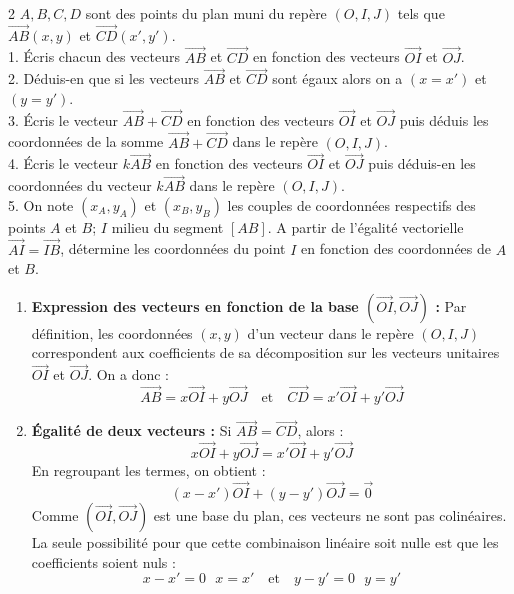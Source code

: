 \begin{multicols*}{2}
  	$A, B, C, D$ sont des points du plan muni du repère $(O, I, J)$ tels que $\overrightarrow{AB}(x, y)$ et $\overrightarrow{CD}(x', y')$. \\
  	1. Écris chacun des vecteurs $\overrightarrow{AB}$ et $\overrightarrow{CD}$ en fonction des vecteurs $\overrightarrow{OI}$ et $\overrightarrow{OJ}$. \\
  	2. Déduis-en que si les vecteurs $\overrightarrow{AB}$ et $\overrightarrow{CD}$ sont égaux alors on a $(x = x')$ et $(y = y')$. \\
  	3. Écris le vecteur $\overrightarrow{AB} + \overrightarrow{CD}$ en fonction des vecteurs $\overrightarrow{OI}$ et $\overrightarrow{OJ}$ puis déduis les coordonnées de la somme $\overrightarrow{AB} + \overrightarrow{CD}$ dans le repère $(O, I, J)$. \\
  	4. Écris le vecteur $k\overrightarrow{AB}$ en fonction des vecteurs $\overrightarrow{OI}$ et $\overrightarrow{OJ}$ puis déduis-en les coordonnées du vecteur $k\overrightarrow{AB}$ dans le repère $(O, I, J)$. \\
  	5. On note $(x_A, y_A)$ et $(x_B, y_B)$ les couples de coordonnées respectifs des points $A$ et $B$; $I$ milieu du segment $[AB]$. A partir de l'égalité vectorielle $\overrightarrow{AI} = \overrightarrow{IB}$, détermine les coordonnées du point $I$ en fonction des coordonnées de $A$ et $B$.\\
  	\dure 
  	\resul 
  	\begin{enumerate}
  		\item \textbf{Expression des vecteurs en fonction de la base $(\overrightarrow{OI}, \overrightarrow{OJ})$ :}
  		Par définition, les coordonnées $(x, y)$ d'un vecteur dans le repère $(O, I, J)$ correspondent aux coefficients de sa décomposition sur les vecteurs unitaires $\overrightarrow{OI}$ et $\overrightarrow{OJ}$. On a donc :
  		\[ \overrightarrow{AB} = x\overrightarrow{OI} + y\overrightarrow{OJ} \quad \text{et} \quad \overrightarrow{CD} = x'\overrightarrow{OI} + y'\overrightarrow{OJ} \]
  		
  		\item \textbf{Égalité de deux vecteurs :}
  		Si $\overrightarrow{AB} = \overrightarrow{CD}$, alors :
  		\[ x\overrightarrow{OI} + y\overrightarrow{OJ} = x'\overrightarrow{OI} + y'\overrightarrow{OJ} \]
  		En regroupant les termes, on obtient :
  		\[ (x - x')\overrightarrow{OI} + (y - y')\overrightarrow{OJ} = \overrightarrow{0} \]
  		Comme $(\overrightarrow{OI}, \overrightarrow{OJ})$ est une base du plan, ces vecteurs ne sont pas colinéaires. La seule possibilité pour que cette combinaison linéaire soit nulle est que les coefficients soient nuls :
  		\[ x - x' = 0 \mbox{  } x = x' \quad \text{et} \quad y - y' = 0 \mbox{  } y = y' \]
  		

\end{enumerate}
\end{multicols*}
